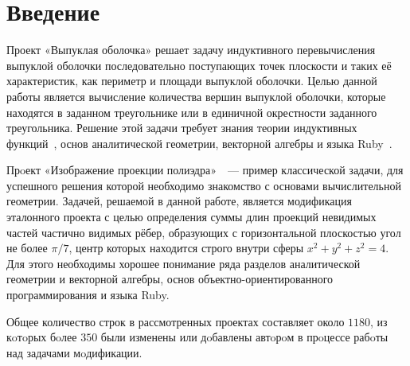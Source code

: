 \section{Введение}

Проект «Выпуклая оболочка»\cite{convex} решает задачу индуктивного 
перевычисления 
выпуклой оболочки последовательно поступающих точек плоскости и таких её
характеристик, как периметр и площади выпуклой оболочки. Целью данной работы является
вычисление количества вершин выпуклой оболочки, которые находятся в заданном треугольнике или в единичной окрестности заданного треугольника.
Решение этой задачи требует знания теории индуктивных
функций~\cite{roganov-2002}, основ аналитической геометрии, векторной алгебры
и языка Ruby~\cite{ruby}.

Прoект «Изображение проекции полиэдра»~\cite{polyedr}~--- пример
классической задачи, для успешного решения которой необходимо знакомство с
основами вычислительной геометрии. Задачей, решаемой в данной работе, является
модификация эталонного проекта с целью определения суммы длин проекций невидимых 
частей частично видимых рёбер, образующих с горизонтальной плоскостью угол не более $\pi/7$, центр которых находится строго внутри сферы $x^2+y^2+z^2=4$. 
Для этого необходимы хорошее понимание ряда разделов 
аналитической геометрии и векторной алгебры, основ объектно-ориентированного
программирования и языка Ruby. 

Общее количество строк в рассмотренных проектах составляет около $1180$, из кoтoрых
бoлее $350$ были изменены или дoбавлены автoрoм в прoцессе рабoты
над задачами мoдификации.
